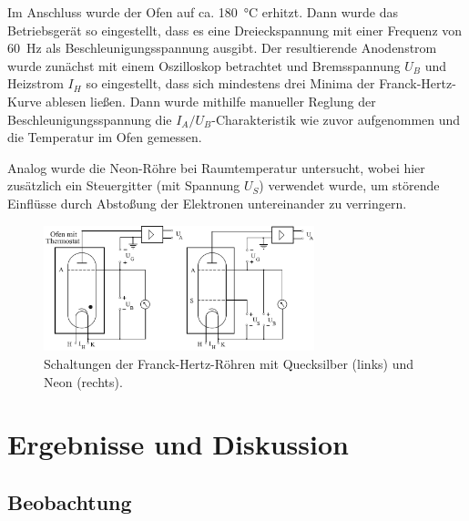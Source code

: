 \documentclass[
	a4paper,
	12pt,
	pagesize,
	ngerman
]{scrartcl}
\begin{document}
	Im Anschluss wurde der Ofen auf ca. \SI{180}{\degreeCelsius} erhitzt.
	Dann wurde das Betriebsgerät so eingestellt, dass es eine Dreieckspannung mit einer Frequenz von \SI{60}{\hertz} als Beschleunigungsspannung ausgibt.
	Der resultierende Anodenstrom wurde zunächst mit einem Oszilloskop betrachtet und Bremsspannung $U_B$ und Heizstrom $I_H$ so eingestellt, dass sich mindestens drei Minima der Franck-Hertz-Kurve ablesen ließen.
	Dann wurde mithilfe manueller Reglung der Beschleunigungsspannung die $I_A/U_B$-Charakteristik wie zuvor aufgenommen und die Temperatur im Ofen gemessen.
	
	Analog wurde die Neon-Röhre bei Raumtemperatur untersucht, wobei hier zusätzlich ein Steuergitter (mit Spannung $U_S$) verwendet wurde, um störende Einflüsse durch Abstoßung der Elektronen untereinander zu verringern. %
	
	\begin{figure}[H]
		\includegraphics[width=0.7\textwidth]{Roehren}
		\centering
		\caption{Schaltungen der Franck-Hertz-Röhren mit Quecksilber (links) und Neon (rechts).\cite{Roehren} }
		\label{Roehren_Schaltung}
		\centering
	\end{figure}

	\section{Ergebnisse und Diskussion}
	

	\subsection{Beobachtung}
	
	
	
\end{document}
